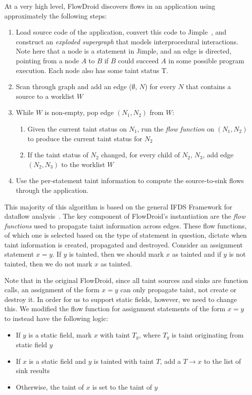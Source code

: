 At a very high level, FlowDroid discovers flows in an application using approximately the following steps:
\begin{enumerate}
\item Load source code of the application, convert this code to Jimple~\cite{soot}, and construct an \emph{exploded supergraph} that models interprocedural interactions. Note here that a node is a statement in Jimple, and an edge is directed, pointing from a node $A$ to $B$ if $B$ could succeed $A$ in some possible program execution. Each node also has some taint status T.
\item Scan through graph and add an edge ($\emptyset$, $N$) for every $N$ that contains a source to a worklist $W$
\item While $W$ is non-empty, pop edge $(N_1, N_2)$ from $W$:
\begin{enumerate}
\item Given the current taint status on $N_1$, run the \emph{flow function} on $(N_1, N_2)$ to produce the current taint status for $N_2$
\item If the taint status of $N_2$ changed, for every child of $N_2$, $N_3$, add edge $(N_2, N_3)$ to the worklist $W$
\end{enumerate}
\item Use the per-statement taint information to compute the source-to-sink flows through the application.
\end{enumerate}

This majority of this algorithm is based on the general IFDS Framework for dataflow analysis~\cite{ifds}. The key component of FlowDroid's instantiation are the \emph{flow functions} used to propagate taint information across edges. These flow functions, of which one is selected based on the type of statement in question, dictate when taint information is created, propagated and destroyed. Consider an assignment statement $x = y$. If $y$ is tainted, then we should mark $x$ as tainted and if $y$ is not tainted, then we do not mark $x$ as tainted. 

Note that in the original FlowDroid, since all taint sources and sinks are function calls, an assignment of the form $x = y$ can only propagate taint, not create or destroy it. In order for us to support static fields, however, we need to change this. We modified the flow function for assignment statements of the form $x = y$ to instead have the following logic:

\begin{itemize}
\item If $y$ is a static field, mark $x$ with taint $T_y$, where $T_y$ is taint originating from static field $y$
\item If $x$ is a static field and $y$ is tainted with taint $T$, add a $T\rightarrow x$ to the list of sink results
\item Otherwise, the taint of $x$ is set to the taint of $y$
\end{itemize}

